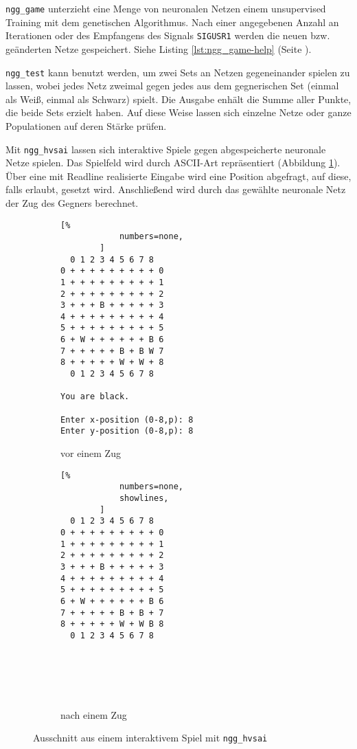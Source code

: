 \texttt{ngg\_game} unterzieht eine Menge von neuronalen Netzen einem
unsupervised Training mit dem genetischen Algorithmus. Nach einer angegebenen
Anzahl an Iterationen oder des Empfangens des Signals \texttt{SIGUSR1} werden
die neuen bzw. geänderten Netze gespeichert.
Siehe Listing \ref{lst:ngg_game-help} (Seite \pageref{lst:ngg_game-help}).

\texttt{ngg\_test} kann benutzt werden, um zwei Sets an Netzen gegeneinander
spielen zu lassen, wobei jedes Netz zweimal gegen jedes aus dem gegnerischen
Set (einmal als Weiß, einmal als Schwarz) spielt. Die Ausgabe enhält die Summe
aller Punkte, die beide Sets erzielt haben. Auf diese Weise lassen sich einzelne
Netze oder ganze Populationen auf deren Stärke prüfen. 

Mit \texttt{ngg\_hvsai} lassen sich interaktive Spiele gegen abgespeicherte
neuronale Netze spielen. Das Spielfeld wird durch ASCII-Art repräsentiert
(Abbildung \ref{fig:ngg_hvsai}). Über eine mit Readline \cite{readline}
realisierte Eingabe wird eine Position abgefragt, auf diese, falls erlaubt,
gesetzt wird. Anschließend wird durch das gewählte neuronale Netz der Zug des
Gegners berechnet.

\begin{figure}
    \centering

    \begin{subfigure}[t]{0.45\textwidth}
        \begin{lstlisting}[%
            numbers=none,
        ]
  0 1 2 3 4 5 6 7 8 
0 + + + + + + + + + 0
1 + + + + + + + + + 1
2 + + + + + + + + + 2
3 + + + B + + + + + 3
4 + + + + + + + + + 4
5 + + + + + + + + + 5
6 + W + + + + + + B 6
7 + + + + + B + B W 7
8 + + + + + W + W + 8
  0 1 2 3 4 5 6 7 8 

You are black.

Enter x-position (0-8,p): 8
Enter y-position (0-8,p): 8
        \end{lstlisting}
        \caption{vor einem Zug}
    \end{subfigure}
    \quad
    \begin{subfigure}[t]{0.35\textwidth}
        \begin{lstlisting}[%
            numbers=none,
            showlines,
        ]
  0 1 2 3 4 5 6 7 8 
0 + + + + + + + + + 0
1 + + + + + + + + + 1
2 + + + + + + + + + 2
3 + + + B + + + + + 3
4 + + + + + + + + + 4
5 + + + + + + + + + 5
6 + W + + + + + + B 6
7 + + + + + B + B + 7
8 + + + + + W + W B 8
  0 1 2 3 4 5 6 7 8 




 
        \end{lstlisting}
        \caption{nach einem Zug}
    \end{subfigure}
    \caption{Ausschnitt aus einem interaktivem Spiel mit \texttt{ngg\_hvsai}}
    \label{fig:ngg_hvsai}
 \end{figure}

